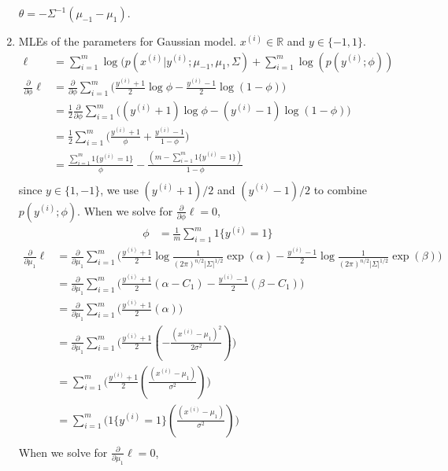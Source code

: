 \documentclass[11pt]{article}
\def\realnumbers{\mathbb{R}}
\begin{document}
\begin{enumerate}
  $\theta = -\Sigma^{-1}(\mu_{-1}-\mu_{1})$.
\newpage
\item MLEs of the parameters for Gaussian model. $x^{(i)} \in \realnumbers$ and $y \in \{-1,1\}$.\\
  \def\yy{y^{(i)}}
  \def\xx{x^{(i)}}
  \def\ssum{\sum_{i=1}^{m}}
  \def\pred{1\{\yy=1\}}
  \begin{align*}
  \ell
  &= \sum_{i=1}^{m}\log(p(x^{(i)}|y^{(i)};\mu_{-1},\mu_{1},\Sigma) + \sum_{i=1}^{m}\log(p(y^{(i)};\phi)) \\
  \frac{\partial}{\partial\phi}\ell
  &= \frac{\partial}{\partial\phi} \sum_{i=1}^{m} \big( \frac{\yy+1}{2}\log\phi - \frac{\yy-1}{2}\log(1-\phi) \big)\\
  &= \frac{1}{2} \frac{\partial}{\partial\phi} \sum_{i=1}^{m} \big( (\yy+1)\log\phi - (\yy-1)\log(1-\phi) \big)  \\
  &= \frac{1}{2} \sum_{i=1}^{m} \big( \frac{\yy+1}{\phi} + \frac{\yy-1}{1-\phi} \big)  \\
  &= \frac{\ssum\pred}{\phi} - \frac{(m-\ssum\pred)}{1-\phi}  \\  
  \end{align*}
  since $y \in \{1,-1\}$, we use $(\yy+1)/2$ and $(\yy-1)/2$ to combine $p(\yy;\phi)$.
  When we solve for $   \frac{\partial}{\partial\phi}\ell = 0 $, 
  \begin{align*}
    \phi &= \frac{1}{m}\ssum\pred
  \end{align*}
  \def\pp{\frac{1}{(2\pi)^{n/2}|\Sigma|^{1/2}}}
  \begin{align*}
    \frac{\partial}{\partial\mu_1}\ell
    &= \frac{\partial}{\partial\mu_1} \sum_{i=1}^{m} \big( \frac{\yy+1}{2}\log\pp\exp(\alpha) - \frac{\yy-1}{2}\log\pp\exp(\beta) \big)\\
    &= \frac{\partial}{\partial\mu_1} \sum_{i=1}^{m} \big( \frac{\yy+1}{2}(\alpha-C_1) - \frac{\yy-1}{2}(\beta-C_1) \big)\\
    &= \frac{\partial}{\partial\mu_1} \sum_{i=1}^{m} \big( \frac{\yy+1}{2}(\alpha) \big)\\
    &= \frac{\partial}{\partial\mu_1} \sum_{i=1}^{m} \big( \frac{\yy+1}{2}(-\frac{(x^{(i)}-\mu_1)^2}{2\sigma^2}) \big)\\
    &= \sum_{i=1}^{m} \big( \frac{\yy+1}{2}(\frac{(x^{(i)}-\mu_1)}{\sigma^2}) \big)\\
    &= \sum_{i=1}^{m} \big( \pred(\frac{(x^{(i)}-\mu_1)}{\sigma^2}) \big)\\
  \end{align*}
  When we solve for $   \frac{\partial}{\partial\mu_1}\ell = 0 $, 

\end{enumerate}
\end{document}
